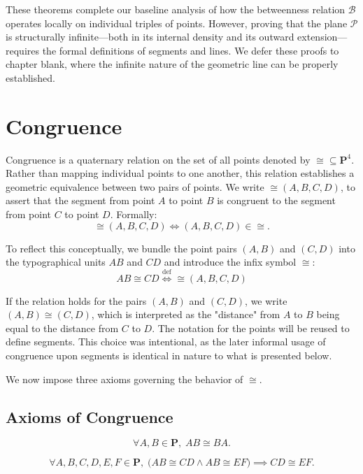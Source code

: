\documentclass[../../../main/main.tex]{subfiles}
\begin{document}
These theorems complete our baseline analysis of how the betweenness relation $\mathcal{B}$ operates locally on individual triples of points. However, proving that the plane $\mathcal{P}$ is structurally infinite—both in its internal density and its outward extension—requires the formal definitions of segments and lines. We defer these proofs to chapter blank, where the infinite nature of the geometric line can be properly established.

\section{Congruence}
Congruence is a quaternary relation on the set of all points denoted by $\cong \subseteq \mathbf{P}^4$. Rather than mapping individual points to one another, this relation establishes a geometric equivalence between two pairs of points. We write $\cong (A,B,C,D)$, to assert that the segment from point $A$ to point $B$ is congruent to the segment from point $C$ to point $D$. Formally:
\[
\cong (A,B,C,D) \iff (A,B,C,D) \in \cong.
\]

To reflect this conceptually, we bundle the point pairs $(A,B)$ and $(C,D)$ into the typographical units $AB$ and $CD$ and introduce the infix symbol $\cong$:
\[
AB \cong CD \overset{\text{def}}{\iff} \cong(A,B,C,D)
\]

If the relation holds for the pairs $(A, B)$ and $(C, D)$, we write $(A, B) \cong (C, D)$, which is interpreted as the "distance" from $A$ to $B$ being equal to the distance from $C$ to $D$. The notation for the points will be reused to define segments. This choice was intentional, as the later informal usage of congruence upon segments is identical in nature to what is presented below.

We now impose three axioms governing the behavior of $\cong$.

\subsection{Axioms of Congruence}

\begin{axiom}\label{ax:cong-reversal}
    \[
    \forall A, B \in \mathbf{P},\; AB \cong BA.
    \]
\end{axiom}

\begin{axiom}\label{ax:cong-trans}
    \[
    \forall A, B, C, D, E, F \in \mathbf{P},\; \bigl(AB \cong CD \land AB \cong EF\bigr) \implies CD \cong EF.
    \]
\end{axiom}
\end{document}
